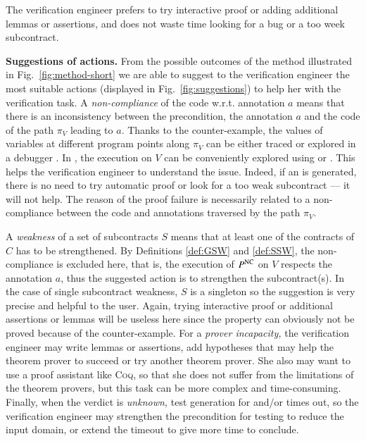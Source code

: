 The verification engineer prefers to  try interactive proof or adding additional
lemmas or assertions,
and does not waste time looking for a bug or a too week subcontract.




\textbf{Suggestions of actions.}
From the possible outcomes of the method illustrated in
Fig.~\ref{fig:method-short} we are able to suggest to the verification engineer 
the most suitable actions (displayed in Fig.~\ref{fig:suggestions})
to help her with the verification task.
A \emph{non-compliance} of the code w.r.t. annotation $a$  means that 
there is an inconsistency between the precondition, the annotation $a$ and the code 
of the path $\pi_V$  leading to $a$.
Thanks to the counter-example, 
the values of variables at different program points along $\pi_V$ 
can be either traced or explored in a debugger \cite{Muller/FM11}. 
In \framac, the execution on $V$ can be 
conveniently explored using \Value or \pathcrawler.
This helps the verification engineer to understand the issue.
Indeed, if an \NCCE is generated, there is no need to
try automatic proof or look for a too weak subcontract --- it will not help.
The reason of the proof failure is necessarily related 
to a non-compliance between 
the code and annotations
traversed by the path $\pi_V$.

A \emph{weakness} of a set of subcontracts $S$ means that at least one of the contracts of $C$
has to be strengthened. By Definitions \ref{def:GSW} and \ref{def:SSW}, the non-compliance is excluded here, 
that is, the execution of $P^{\mathrm{NC}}$ on  $V$  respects the annotation $a$, thus
the suggested action is to strengthen the subcontract(s).
In the case of single subcontract weakness, $S$ is a singleton so the suggestion
is very precise and helpful to the user.
Again, trying interactive proof or additional assertions or lemmas 
will be useless here since the property can obviously not be proved 
because of the counter-example.
For a \emph{prover incapacity,} the verification engineer
may write lemmas or assertions, add hypotheses that may help the theorem prover to
succeed or try another theorem prover.
She also may want to use a proof assistant like \textsc{Coq}, so that she does
not suffer from the limitations of the theorem provers, but 
this task can be more complex and time-consuming.
Finally, when the verdict is \emph{unknown,} test generation for \NCD and/or \SWD times out, 
so the verification engineer may strengthen the
precondition for testing to reduce the input domain, or extend the timeout to
give \stady more time to conclude.


